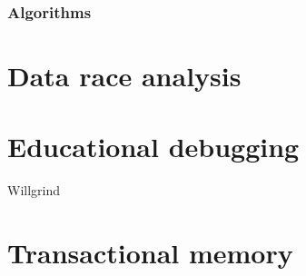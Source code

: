 \subsubsection{Algorithms}








\section{Data race analysis}

\section{Educational debugging}

Willgrind \cite{willgrind}

\section{Transactional memory}



